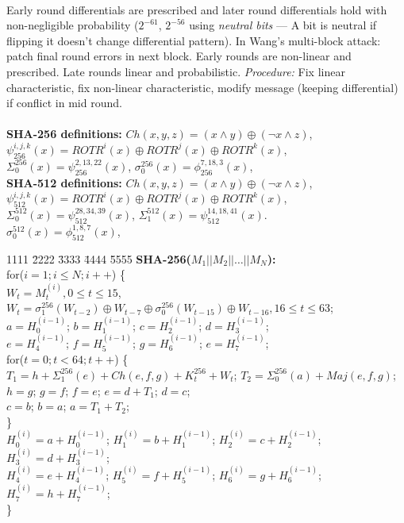 \\
Early round differentials are
prescribed and later round differentials hold with non-negligible probability ($2^{-61}$,
$2^{-56}$ using \emph{neutral bits} --- A bit is neutral if flipping it doesn't change 
differential pattern).  
In Wang's multi-block attack:  patch final round errors in next block.
Early rounds are non-linear and prescribed.  Late rounds linear and probabilistic. 
\emph{Procedure:}  Fix linear characteristic, fix non-linear
characteristic, modify message (keeping differential) if conflict in mid round.
\\
\\
{\bf SHA-256 definitions:}
$Ch(x,y,z)= (x \wedge y) \oplus (\neg x \wedge z)$,  
$\psi_{256}^{i, j, k}(x)= ROTR^i (x) \oplus ROTR^j (x) \oplus ROTR^k (x)$,
$\Sigma_0^{256}(x)= \psi_{256}^{2, 13, 22} (x)$,
$\sigma_0^{256}(x)= \phi_{256}^{7, 18, 3} (x)$,
\\
{\bf SHA-512 definitions:}
$Ch(x,y,z)= (x \wedge y) \oplus (\neg x \wedge z)$,  
$\psi_{512}^{i, j, k}(x)= ROTR^i (x)  \oplus ROTR^j (x)  \oplus ROTR^k (x)$,
$\Sigma_0^{512}(x)= \psi_{512}^{28, 34, 39} (x)$,
$\Sigma_1^{512}(x)= \psi_{512}^{14, 18, 41} (x)$. \\
$\sigma_0^{512}(x)= \phi_{512}^{1,8,7} (x)$,
\begin{tabbing}
1111 \= 2222 \= 3333 \= 4444 \= 5555 \kill
{\bf SHA-256($M_1 || M_2 || \ldots || M_N$):}\\
for($i=1; i \le N; i++$)  \{\\
    \> $W_t= M_t^{(i)}, 0 \le t \le 15$,\\
    \> $W_t= \sigma_1^{256}(W_{t-2}) \oplus W_{t-7} \oplus \sigma_0^{256}(W_{t-15}) \oplus W_{t-16}, 16 \le t \le 63$;\\
    \> $a= H_0^{(i-1)}$; $b= H_1^{(i-1)}$; $c= H_2^{(i-1)}$; $d= H_3^{(i-1)}$; \\
    \> $e= H_4^{(i-1)}$; $f= H_5^{(i-1)}$; $g= H_6^{(i-1)}$; $e= H_7^{(i-1)}$; \\
    \> for($t=0; t<64;t++$) \{ \\
    \>   \> $T_1=h + \Sigma_1^{256}(e)+Ch(e,f,g)+K_t^{256}+W_t$; $T_2= \Sigma_0^{256}(a)+Maj(e,f,g)$; \\
    \>   \> $h= g$; $g= f$; $f=e$; $e= d+T_1$; $d=c$;\\
    \>   \> $c=b$; $b=a$; $a= T_1+T_2$; \\
    \>   \> \} \\
    \> $H_0^{(i)}= a+ H_0^{(i-1)}$; $H_1^{(i)}= b+ H_1^{(i-1)}$; $H_2^{(i)}= c+ H_2^{(i-1)}$; $H_3^{(i)}= d+ H_3^{(i-1)}$;\\
    \> $H_4^{(i)}= e+ H_4^{(i-1)}$; $H_5^{(i)}= f+ H_5^{(i-1)}$; $H_6^{(i)}= g+ H_6^{(i-1)}$; $H_7^{(i)}= h+ H_7^{(i-1)}$;\\
    \> \} 
\end{tabbing}
